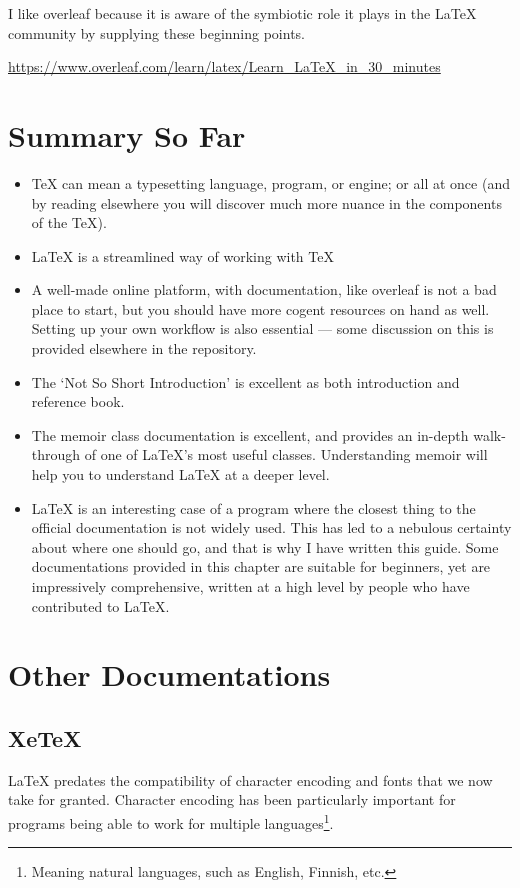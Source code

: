 \documentclass[11pt, oneside]{memoir}
\begin{document}
I like overleaf because it is aware of the symbiotic role it plays in the LaTeX community by supplying these beginning points.

\url{https://www.overleaf.com/learn/latex/Learn_LaTeX_in_30_minutes}

\section{Summary So Far}
\begin{itemize}
\item \TeX{} can mean a typesetting language, program, or engine; or all at once (and by reading elsewhere you will discover much more nuance in the components of the \TeX{}).
\item \LaTeX{} is a streamlined way of working with \TeX{} 
\item A well-made online platform, with documentation, like overleaf is not a bad place to start, but you should have more cogent resources on hand as well. Setting up your own workflow is also essential — some discussion on this is provided elsewhere in the repository.
\item The `Not So Short Introduction' is excellent as both introduction and reference book.
\item The memoir class documentation is excellent, and provides an in-depth walk-through of one of LaTeX's most useful classes. Understanding memoir will help you to understand LaTeX at a deeper level.
\item \LaTeX{} is an interesting case of a program where the closest thing to the official documentation is not widely used. This has led to a nebulous certainty about where one should go, and that is why I have written this guide. Some documentations provided in this chapter are suitable for beginners, yet are impressively comprehensive, written at a high level by people who have contributed to LaTeX.
\end{itemize}

\section{Other Documentations}
\subsection{XeTeX}

LaTeX predates the compatibility of character encoding and fonts that we now take for granted. Character encoding has been particularly important for programs being able to work for multiple languages\footnote{Meaning natural languages, such as English, Finnish, etc.}.
\end{document}
